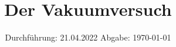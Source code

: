 

\subject{V70}
\title{Der Vakuumversuch}
\date{%
  Durchführung: 21.04.2022
  \hspace{3em}
  Abgabe: \today
}



\maketitle
\thispagestyle{empty}
\tableofcontents
\newpage







\nocite{matplotlib}
\nocite{numpy}
\nocite{scipy}
\nocite{uncertainties}
\newpage
\printbibliography{}


